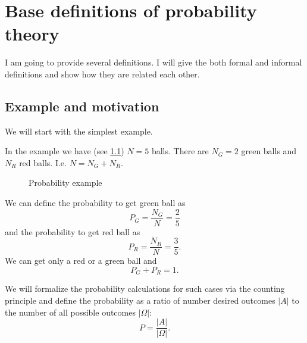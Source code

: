 \chapter{Base definitions of probability theory}
I am going to provide several definitions. I will give the both formal
and informal definitions and show how they are related each other.

\section{Example and motivation}
We will start with the simplest example. 
\begin{example}
\label{ex:initial}
In the example we have (see \cref{fig:simpleprobability}) $N=5$ balls.
There are $N_G = 2$ green balls and $N_R$ red balls. I.e. $N = N_G +
N_R$.  
\begin{figure}[H]
  \centering
  \caption{Probability example}
  \label{fig:simpleprobability}
\end{figure}

We can define the probability to get green ball as
\[
P_G = \frac{N_G}{N} = \frac{2}{5}
\]
and the probability to get red ball as
\[
P_R = \frac{N_R}{N} = \frac{3}{5}.
\]
We can get only a red or a green ball and 
\[
P_G + P_R = 1.
\]
\end{example}

We will formalize the probability calculations for such cases via the
counting principle and define the probability as a ratio of number
desired outcomes $\left|A\right|$ to the number of all possible
outcomes $\left|\Omega\right|$:
\[
P = \frac{\left|A\right|}{\left|\Omega\right|}.
\]

